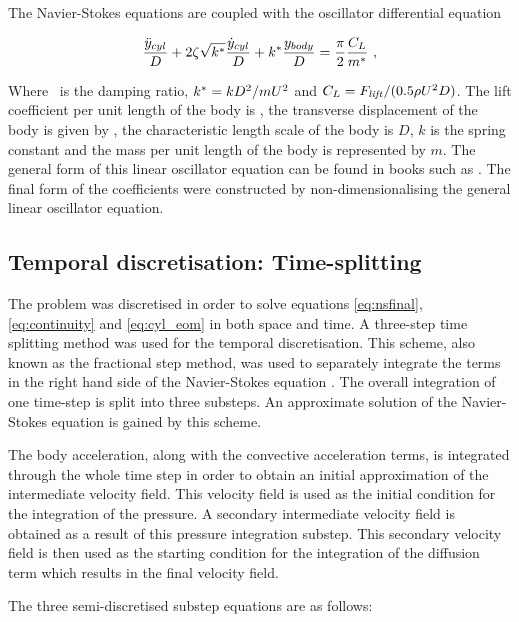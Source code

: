   The Navier-Stokes equations are coupled with the oscillator differential equation 
  
  \begin{equation} \centering
  \label{eq:cyl_eom}
  \frac{\ddot{y}_{cyl}}{D} + 2\damping\sqrt{\kstar}\frac{\dot{y}_{cyl}}{D} + \kstar\frac{\ycyl}{D} = \frac{\pi}{2}\frac{\clift}{\mstar} ~,
  \end{equation}

Where \damping \ is the damping ratio,  $k^{*}=kD^{2}/mU^{2}$ and $C_{L} = F_{\mathit{lift}}/(0.5\rho U^{2}D)$. The lift coefficient per unit length of the body is \clift, the transverse displacement of the body is given by \ycyl,  the characteristic length scale of the body is $D$, $k$ is the spring constant and the mass per unit length of the body is represented by $m$. The general form of this linear oscillator equation can be found in books such as  \citet{Naudasher94}. The final form of the coefficients were constructed by non-dimensionalising the general linear oscillator equation. 
    
    
 
 \subsection{Temporal discretisation: Time-splitting}
 
 The problem was discretised in order to solve equations \ref{eq:nsfinal}, \ref{eq:continuity} and \ref{eq:cyl_eom} in both space and time. A three-step time splitting method was used for the temporal discretisation. This scheme, also known as the fractional step method, was used to separately integrate the terms in the right hand side of the Navier-Stokes equation \citep{karniadakis2005}. The overall integration of one time-step is split into three substeps. An approximate solution of the Navier-Stokes equation is gained by this scheme. 
 
 The body acceleration, along with the convective acceleration terms, is integrated through the whole time step in order to obtain an initial approximation of the intermediate velocity field. This velocity field is used as the initial condition for the integration of the pressure. A secondary intermediate velocity field is obtained as a result of this pressure integration substep. This secondary velocity field is then used as the starting condition for the integration of the diffusion term which results in the final velocity field. 
 
 The three semi-discretised substep equations are as follows:
 
